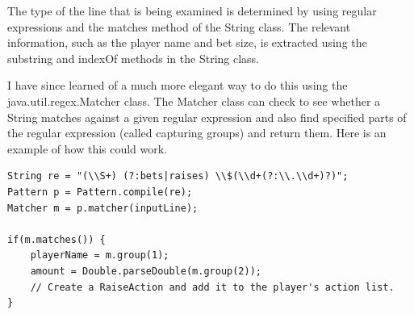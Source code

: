 The type of the line that is being examined is determined by using regular expressions and the matches method of the String class. The relevant information, such as the player name and bet size, is extracted using the substring and indexOf methods in the String class.



I have since learned of a much more elegant way to do this using the java.util.regex.Matcher class. The Matcher class can check to see whether a String matches against a given regular expression and also find specified parts of the regular expression (called capturing groups) and return them. Here is an example of how this could work.
\begin{verbatim}
String re = "(\\S+) (?:bets|raises) \\$(\\d+(?:\\.\\d+)?)";
Pattern p = Pattern.compile(re);
Matcher m = p.matcher(inputLine);

if(m.matches()) {
    playerName = m.group(1);
    amount = Double.parseDouble(m.group(2));
    // Create a RaiseAction and add it to the player's action list.
}
\end{verbatim}


